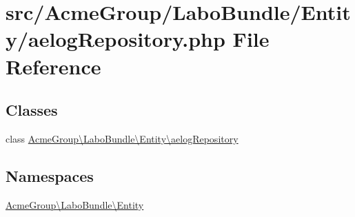 \hypertarget{aelog_repository_8php}{\section{src/\+Acme\+Group/\+Labo\+Bundle/\+Entity/aelog\+Repository.php File Reference}
\label{aelog_repository_8php}
}
\subsection*{Classes}
\begin{DoxyCompactItemize}
\item 
class \hyperlink{class_acme_group_1_1_labo_bundle_1_1_entity_1_1aelog_repository}{Acme\+Group\textbackslash{}\+Labo\+Bundle\textbackslash{}\+Entity\textbackslash{}aelog\+Repository}
\end{DoxyCompactItemize}
\subsection*{Namespaces}
\begin{DoxyCompactItemize}
\item 
 \hyperlink{namespace_acme_group_1_1_labo_bundle_1_1_entity}{Acme\+Group\textbackslash{}\+Labo\+Bundle\textbackslash{}\+Entity}
\end{DoxyCompactItemize}
